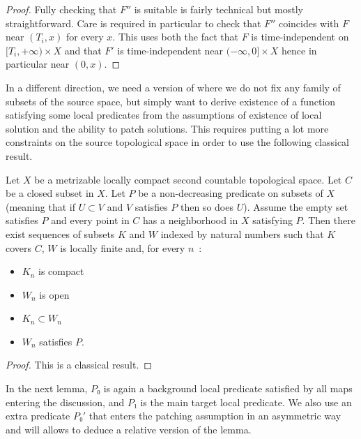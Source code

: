 \documentclass[10pt,a4paper]{article}
\newcommand{\lean}[1]{}
\newcommand{\leanok}{}
\begin{document}
\begin{proof}
  Fully checking that $F''$ is suitable is fairly technical but mostly straightforward.
  Care is required in particular to check that $F''$ coincides with $F$ near
  $(T_i, x)$ for every $x$. This uses both the fact that $F$ is time-independent on
  $[T_i, + ∞) × X$ and that $F'$ is time-independent near $(-∞, 0] × X$ hence in particular
  near $(0, x)$.
\end{proof}

In a different direction, we need a version of  where
we do not fix any family of subsets of the source space, but simply want to derive existence
of a function satisfying some local predicates from the assumptions of
existence of local solution and the ability to patch solutions. This requires putting a lot
more constraints on the source topological space in order to use the following classical
result.

\begin{lemma}
  \label{lem:exists_locally_finite_subcover_of_locally}
  \lean{exists_locallyFinite_subcover_of_locally}\leanok
  Let $X$ be a metrizable locally compact second countable topological space.
  Let $C$ be a closed subset in $X$. Let $P$ be a non-decreasing predicate on subsets
  of $X$ (meaning that if $U ⊂ V$ and $V$ satisfies $P$ then so does $U$). Assume
  the empty set satisfies $P$ and every point in $C$ has a neighborhood in $X$
  satisfying $P$. Then there exist sequences of subsets $K$ and $W$ indexed by
  natural numbers such that $K$ covers $C$, $W$ is locally finite and, for every $n$~:
  \begin{itemize}
    \item $K_n$ is compact
    \item $W_n$ is open
    \item $K_n ⊂ W_n$
    \item $W_n$ satisfies $P$.
  \end{itemize}
\end{lemma}

\begin{proof}
  \leanok
  This is a classical result.
\end{proof}

In the next lemma, $P₀$ is again a background local predicate satisfied by all
maps entering the discussion, and $P₁$ is the main target local predicate. We also use
an extra predicate $P₀'$ that enters the patching assumption in an asymmetric way
and will allows to deduce a relative version of the lemma.
\end{document}
